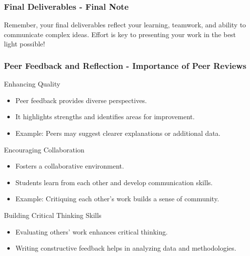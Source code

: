 \documentclass[aspectratio=169]{beamer}
\begin{document}
\begin{frame}[fragile]
    \frametitle{Final Deliverables - Final Note}
    Remember, your final deliverables reflect your learning, teamwork, and ability to communicate complex ideas. Effort is key to presenting your work in the best light possible!
\end{frame}

\begin{frame}[fragile]
    \frametitle{Peer Feedback and Reflection - Importance of Peer Reviews}
    \begin{block}{Enhancing Quality}
        \begin{itemize}
            \item Peer feedback provides diverse perspectives.
            \item It highlights strengths and identifies areas for improvement.
            \item Example: Peers may suggest clearer explanations or additional data.
        \end{itemize}
    \end{block}

    \begin{block}{Encouraging Collaboration}
        \begin{itemize}
            \item Fosters a collaborative environment.
            \item Students learn from each other and develop communication skills.
            \item Example: Critiquing each other's work builds a sense of community.
        \end{itemize}
    \end{block}

    \begin{block}{Building Critical Thinking Skills}
        \begin{itemize}
            \item Evaluating others' work enhances critical thinking.
            \item Writing constructive feedback helps in analyzing data and methodologies.
        \end{itemize}
    \end{block}
\end{frame}
\end{document}
